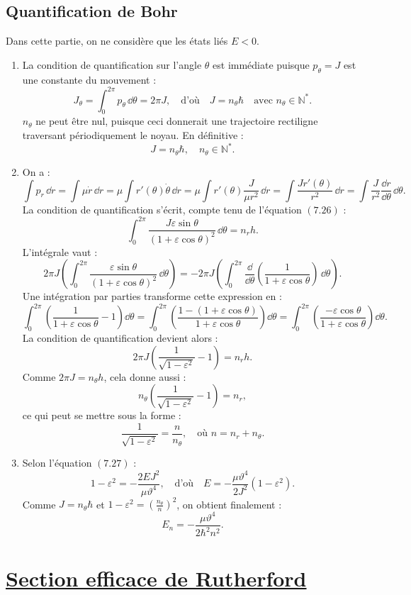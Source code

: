 \documentclass[a4paper,10pt]{report}
\begin{document}
\subsection{Quantification de Bohr}
Dans cette partie, on ne considère que les états liés $E < 0$.
\begin{enumerate}
\item

La condition de quantification sur l'angle $\theta$ est immédiate puisque $p_\theta = J$ est une constante du mouvement :
\[
J_\theta = \int_0^{2\pi} p_\theta \, \dd \theta = 2\pi J, \quad \text{d'où} \quad J = n_\theta \hbar \quad \text{avec } n_\theta \in \mathbb{N}^*.
\]
$n_\theta$ ne peut être nul, puisque ceci donnerait une trajectoire rectiligne traversant périodiquement le noyau. En définitive :
\[
J = n_\theta \hbar, \quad n_\theta \in \mathbb{N}^*.
\]

\item

On a :
\[
\int p_r \, \dd r = \int \mu \dot{r} \, \dd r = \mu \int r'(\theta) \dot{\theta} \, \dd r = \mu \int r'(\theta) \frac{J}{\mu r^2} \, \dd r = \int \frac{J r'(\theta)}{r^2} \, \dd r = \int \frac{J}{r^2} \frac{\dd r}{\dd \theta} \, \dd \theta.
\]
La condition de quantification s’écrit, compte tenu de l’équation $(7.26)$ :
\[
\int_0^{2\pi} \frac{J\varepsilon \sin \theta}{(1 + \varepsilon \cos \theta)^2} \, \dd \theta = n_r h.
\]
L’intégrale vaut :
\[
2\pi J \left( \int_0^{2\pi} \frac{\varepsilon \sin \theta}{(1 + \varepsilon \cos \theta)^2} \, \dd \theta \right) = -2\pi J \left( \int_0^{2\pi} \frac{\dd}{\dd \theta} \left( \frac{1}{1 + \varepsilon \cos \theta} \right) \, \dd \theta \right).
\]
Une intégration par parties transforme cette expression en :
\[
\int_0^{2\pi} \left( \frac{1}{1 + \varepsilon \cos \theta} - 1 \right) \dd \theta = \int_0^{2\pi} \left( \frac{1 - (1 + \varepsilon \cos \theta)}{1 + \varepsilon \cos \theta} \right) \dd \theta = \int_0^{2\pi} \left( \frac{- \varepsilon \cos \theta}{1 + \varepsilon \cos \theta} \right) \dd \theta.
\]
La condition de quantification devient alors :
\[
2\pi J \left( \frac{1}{\sqrt{1 - \varepsilon^2}} - 1 \right) = n_r h.
\]
Comme $2\pi J = n_\theta h$, cela donne aussi :
\[
n_\theta \left( \frac{1}{\sqrt{1 - \varepsilon^2}} - 1 \right) = n_r,
\]
ce qui peut se mettre sous la forme :
\[
\frac{1}{\sqrt{1 - \varepsilon^2}} = \frac{n}{n_\theta}, \quad \text{où } n = n_r + n_\theta.
\tag{7.28}
\]

\item

Selon l’équation $(7.27)$ :
\[
1 - \varepsilon^2 = -\frac{2EJ^2}{\mu \vartheta^4}, \quad \text{d’où} \quad E = - \frac{\mu \vartheta^4}{2 J^2} (1 - \varepsilon^2).
\]
Comme $J = n_\theta \hbar$ et $1 - \varepsilon^2 = \left( \frac{n_\theta}{n} \right)^2$, on obtient finalement :
\[
E_n = - \frac{\mu \vartheta^4}{2 \hbar^2 n^2}.
\tag{7.29}
\]
\end{enumerate}
	\newpage \section{\hyperref[subsec:Rutherford]{Section efficace de Rutherford}}\label{subsec:correctionRutherford}
\end{document}
